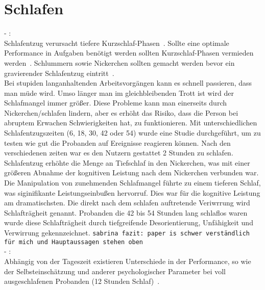 \section{Schlafen}\label{sec:relatedWork.schlafen}

- \cite{dinges1985assessing}:\\

Schlafentzug verursacht tiefere Kurzschlaf-Phasen~\cite{dinges1985assessing}. Sollte eine optimale Performance in Aufgaben benötigt werden sollten Kurzschlaf-Phasen vermieden werden~\cite{dinges1985assessing}. Schlummern sowie Nickerchen sollten gemacht werden bevor ein gravierender Schlafentzug eintritt~\cite{dinges1985assessing}.\\
Bei stupiden langanhaltenden Arbeitsvorgängen kann es schnell passieren, dass man müde wird. Umso länger man im gleichbleibenden Trott ist wird der Schlafmangel immer größer. Diese Probleme kann man einerseits durch Nickerchen/schlafen lindern, aber es erhöht das Risiko, dass die Person bei abruptem Erwachen Schwierigkeiten hat, zu funktionieren. Mit unterschiedlichen Schlafentzugszeiten (6, 18, 30, 42 oder 54) wurde eine Studie durchgeführt, um zu testen wie gut die Probanden auf Ereignisse reagieren können. Nach den verschiedenen zeiten war es den Nutzern gestattet 2 Stunden zu schlafen. Schlafentzug erhöhte die Menge an Tiefschlaf in den Nickerchen, was mit einer größeren Abnahme der kognitiven Leistung nach dem Nickerchen verbunden war.\\
Die Manipulation von zunehmenden Schlafmangel führte zu einem tieferen Schlaf, was siginifikante Leistungseinbußen hervorruf. Dies war für die kognitive Leistung am dramatischsten. Die direkt nach dem schlafen auftretende Veriwrrung wird Schlafträgheit genannt. Probanden die 42 bis 54 Stunden lang schlaflos waren wurde diese Schlafträgheit durch tiefgreifende Desorientierung, Unfähigkeit und Verwirrung gekennzeichnet.
\texttt{sabrina fazit: paper is schwer verständlich für mich und Hauptaussagen stehen oben}\\

- \cite{kraemer2000time}:\\

Abhängig von der Tageszeit existieren Unterschiede in der Performance, so wie der Selbsteinschätzung und anderer psychologischer Parameter bei voll ausgeschlafenen Probanden (12 Stunden Schlaf)~\cite{kraemer2000time}.


